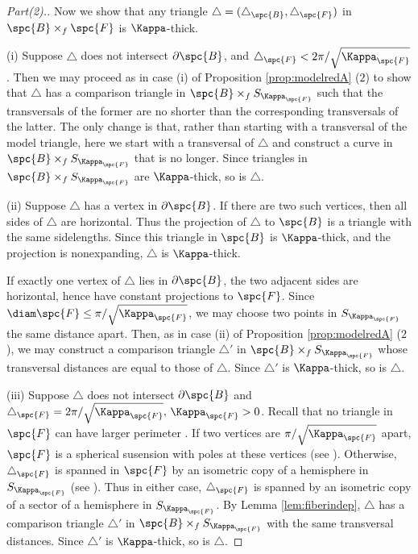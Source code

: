 \begin{proof}[Part(2).]
Now we show that any triangle $\triangle=(\triangle_\spc{B},\triangle_\spc{F})$ in
$\spc{B}\times_f\spc{F}$ is $\Kappa$-thick.

(i) Suppose $\triangle$ does not intersect $\partial \spc{B}$, and
$\triangle_\spc{F}<2\pi/\sqrt{\Kappa_\spc{F}}$.  Then we may proceed as in case
(i) of Proposition
\ref{prop:modelredA} ($2$) to show that $\triangle$ has a comparison
triangle in $\spc{B}\times_fS_{\Kappa_\spc{F}}$ such that the
transversals of the former are no shorter than the corresponding
transversals of the latter. The only change is that, rather than
starting with a transversal of the model triangle, here we start with a
transversal of $\triangle$ and construct a curve in $\spc{B}\times_fS_{\Kappa_\spc{F}}$ that
is no longer.  Since triangles in $\spc{B}\times_fS_{\Kappa_\spc{F}}$ are $\Kappa$-thick,
so is $\triangle$.

(ii) Suppose $\triangle$ has a vertex in $\partial \spc{B}$.  If there are
two such vertices, then all sides of $\triangle$ are horizontal.
Thus the projection of $\triangle$ to $\spc{B}$ is a triangle with the same
sidelengths.  Since this triangle in $\spc{B}$ is $\Kappa$-thick, and the
projection is nonexpanding, $\triangle$ is $\Kappa$-thick.

If exactly one vertex of $\triangle$ lies in
$\partial \spc{B}$, the two adjacent sides are horizontal, hence have
constant projections to $\spc{F}$.  Since $\diam \spc{F} \le \pi/\sqrt{\Kappa_\spc{F}}$, we
may choose two points in $S_{\Kappa_\spc{F}}$ the
same distance apart.  Then, as in case (ii) of Proposition
\ref{prop:modelredA} ($2$), we may construct a comparison triangle
$\triangle'$  in $\spc{B}\times_fS_{\Kappa_\spc{F}}$ whose transversal distances are
equal to those of $\triangle$.  Since $\triangle'$ is $\Kappa$-thick, so
is $\triangle$.

(iii) Suppose $\triangle$ does not intersect $\partial \spc{B}$ and
$\triangle_\spc{F}=2\pi/\sqrt{\Kappa_\spc{F}},\, \Kappa_\spc{F}>0$. Recall that no triangle
in $\spc{F}$ can have larger perimeter \cite{BGP}. If two vertices are
$\pi/\sqrt{\Kappa_\spc{F}}$ apart, $\spc{F}$ is a spherical susension with poles at
these vertices (see \cite[p.369]{BBI}).  Otherwise, $\triangle_\spc{F}$
is spanned in $\spc{F}$ by an isometric copy of a hemisphere in $S_{\Kappa_\spc{F}}$
(see \cite[p.836]{Pl}). Thus in either case, $\triangle_\spc{F}$ is spanned
by an isometric copy of a sector of a hemisphere in $S_{\Kappa_\spc{F}}$.  By
Lemma \ref{lem:fiberindep}, $\triangle$ has a comparison triangle
$\triangle'$ in $\spc{B}\times_fS_{\Kappa_\spc{F}}$ with the same transversal
distances. Since $\triangle'$ is $\Kappa$-thick, so is $\triangle$.


\end{proof}

